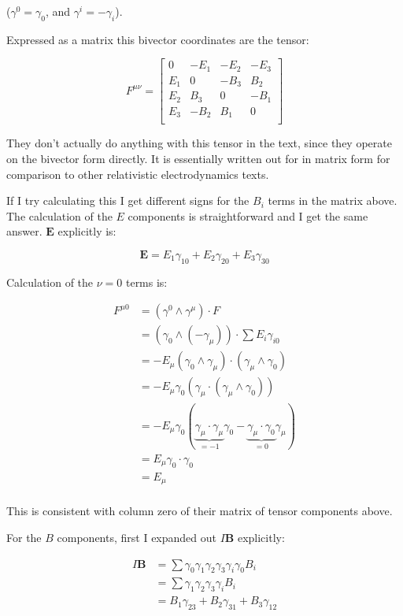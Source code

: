 ($\gamma^0 = \gamma_0$, and $\gamma^i = -\gamma_i$).

Expressed as a matrix this bivector coordinates are the tensor:

\[
F^{\mu\nu} =
\begin{bmatrix}
0 & -E_1 & -E_2 & -E_3 \\
E_1 & 0 & -B_3 & B_2 \\
E_2 & B_3 & 0 & -B_1 \\
E_3 & -B_2 & B_1 & 0 \\
\end{bmatrix}
\]

They don't actually do anything with this tensor in the text, since they operate on the bivector form directly.  It is essentially written out for in matrix form for comparison to other relativistic electrodynamics texts.

If I try calculating this I get different signs for the $B_i$ terms in the matrix above.  The 
calculation of the $E$ components is straightforward and I get the same answer.  $\mathbf{E}$ explicitly is:

\[
\mathbf{E} = E_1 \gamma_{10} + E_2 \gamma_{20} + E_3 \gamma_{30}
\]

Calculation of the $\nu = 0$ terms is:

\begin{align*}
F^{\mu 0} 
&= (\gamma^0 \wedge \gamma^\mu) \cdot F \\
&= (\gamma_0 \wedge (-\gamma_\mu)) \cdot \sum E_i \gamma_{i0} \\
&= -E_\mu (\gamma_0 \wedge \gamma_\mu) \cdot (\gamma_\mu \wedge \gamma_{0}) \\
&= -E_\mu \gamma_0 (\gamma_\mu \cdot (\gamma_\mu \wedge \gamma_{0})) \\
&= -E_\mu \gamma_0 ( \underbrace{\gamma_\mu \cdot \gamma_\mu}_{=-1} \gamma_{0} - \underbrace{\gamma_\mu \cdot \gamma_{0}}_{=0} \gamma_\mu) \\
&= E_\mu \gamma_0 \cdot \gamma_0 \\
&= E_\mu \\
\end{align*}

This is consistent with column zero of their matrix of tensor components above.

For the $B$ components, first I expanded out $I\mathbf{B}$ explicitly:

\begin{align*}
I\mathbf{B} 
&= \sum \gamma_0 \gamma_1 \gamma_2 \gamma_3 \gamma_i \gamma_0 B_i \\
&= \sum \gamma_1 \gamma_2 \gamma_3 \gamma_i B_i \\
&= B_1 \gamma_{23} + B_2 \gamma_{31} + B_3 \gamma_{12}
\end{align*}

